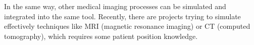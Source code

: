 In the same way, other medical imaging processes can be simulated and integrated into the same tool. Recently, there are projects trying to simulate effectively techniques like MRI (magnetic resonance imaging) or CT (computed tomography), which requires some patient position knowledge. 

